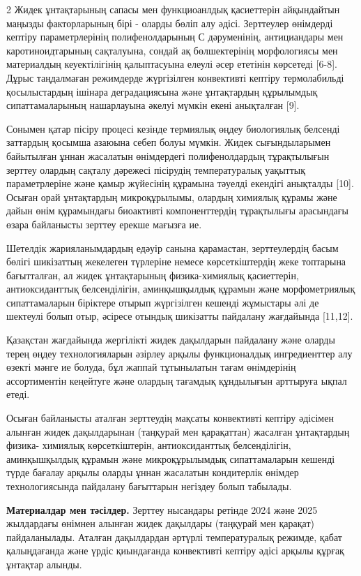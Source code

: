 \begin{multicols}{2}
Жидек ұнтақтарының сапасы мен функциоанлдық қасиеттерін айқындайтын
маңызды факторларының бірі - оларды бөліп алу әдісі. Зерттеулер
өнімдерді кептіру параметрлерінің полифенолдарының С дәруменінің,
антициандары мен каротиноидтарының сақталуына, сондай ақ бөлшектерінің
морфологиясы мен материалдың кеуектілігінің қалыптасуына елеулі әсер
ететінін көрсетеді {[}6-8{]}. Дұрыс таңдалмаған режимдерде жүргізілген
конвективті кептіру термолабильді қосылыстардың ішінара деградациясына
және ұнтақтардың құрылымдық сипаттамаларының нашарлауына әкелуі мүмкін
екені анықталған {[}9{]}.

Сонымен қатар пісіру процесі кезінде термиялық өңдеу биологиялық
белсенді заттардың қосымша азаюына себеп болуы мүмкін. Жидек
сығындыларымен байытылған ұннан жасалатын өнімдердегі полифенолдардың
тұрақтылығын зерттеу олардың сақталу дәрежесі пісірудің температуралық
уақыттық параметрлеріне және қамыр жүйесінің құрамына тәуелді екендігі
анықталды {[}10{]}. Осыған орай ұнтақтардың микроқұрылымы, олардың
химиялық құрамы және дайын өнім құрамындағы биоактивті компоненттердің
тұрақтылығы арасындағы өзара байланысты зерттеу ерекше мағызға ие.

Шетелдік жарияланымдардың едәуір санына қарамастан, зерттеулердің басым
бөлігі шикізаттың жекелеген түрлеріне немесе көрсеткіштердің жеке
топтарына бағытталған, ал жидек ұнтақтарының физика-химиялық
қасиеттерін, антиоксиданттық белсенділігін, аминқышқылдық құрамын және
морфометриялық сипаттамаларын біріктере отырып жүргізілген кешенді
жұмыстары әлі де шектеулі болып отыр, әсіресе отындық шикізатты
пайдалану жағдайында {[}11,12{]}.

Қазақстан жағдайында жергілікті жидек дақылдарын пайдалану және оларды
терең өңдеу технологияларын әзірлеу арқылы функционалдық ингредиенттер
алу өзекті мәнге ие болуда, бұл жаппай тұтынылатын тағам өнімдерінің
ассортиментін кеңейтуге және олардың тағамдық құндылығын арттыруға ықпал
етеді.

Осыған байланысты аталған зерттеудің мақсаты конвективті кептіру
әдісімен алынған жидек дақылдарынан (таңқурай мен қарақаттан) жасалған
ұнтақтардың физика- химиялық көрсеткіштерін, антиоксиданттық
белсенділігін, аминқышқылдық құрамын және микроқұрылымдық сипаттамаларын
кешенді түрде бағалау арқылы оларды ұннан жасалатын кондитерлік өнімдер
технологиясында пайдалану бағыттарын негіздеу болып табылады.

{\bfseries Материалдар мен тәсілдер.} Зерттеу нысандары ретінде 2024 және
2025 жылдардағы өнімнен алынған жидек дақылдары (таңқурай мен қарақат)
пайдаланылады. Аталған дақылдардан әртүрлі температуралық режимде, қабат
қалыңдағанда және үрдіс қиындағанда конвективті кептіру әдісі арқылы
құрғақ ұнтақтар алынды.


\end{multicols}

